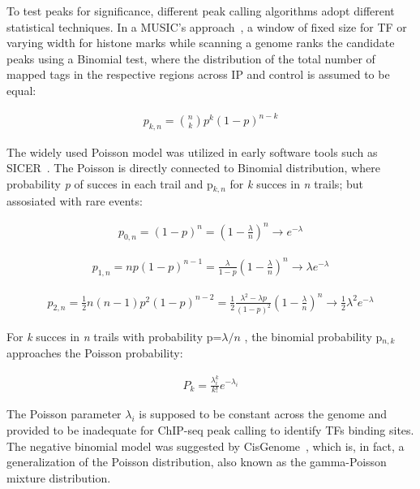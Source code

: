 To test peaks for significance, different peak calling algorithms adopt different statistical techniques. 
In a MUSIC's approach~\cite{harmanci2014music}, a window of fixed size for TF or varying width for histone marks while scanning a genome ranks the candidate peaks using a Binomial test, where the distribution of the total number of mapped tags in the respective regions across IP and control is assumed to be equal:

\begin{align*}
    p_{k,n} = \binom{n}{k}p^k(1-p)^{n-k}
\end{align*}

The widely used Poisson model was utilized in early software tools such as SICER~\cite{zang2009clustering}. 
The Poisson is directly connected to Binomial distribution,
where probability \textit{p} of succes in each trail and p$_{k,n}$  for \textit{k} succes in \textit{n} trails; but assosiated with rare events:

\begin{align*}
    p_{0,n} = (1 - p)^{n} = \left(1-{\frac{\lambda}{n}}\right)^{n} \to e^{-\lambda}
\end{align*}

\begin{align*}
    p_{1,n} = np(1 - p)^{n-1} = \frac{\lambda}{1-p}\left(1-{\frac{\lambda}{n}}\right)^{n} \to \lambda e^{-\lambda}
\end{align*}

\begin{align*}
    p_{2,n} = \frac{1}{2} n(n - 1) p^{2} (1-p)^{n-2} = \frac{1}{2} \frac{\lambda^{2} - \lambda p}{ (1-p)^{2}} \left(1-{\frac{\lambda}{n}}\right)^{n} \to \frac{1}{2} \lambda^{2} e^{-\lambda}
\end{align*}

For \textit{k} succes in \textit{n} trails with probability p=${\lambda / n}$ , the binomial probability p$_{n,k}$ approaches the Poisson probability:

\begin{align*}
    P_k = \frac{\lambda _i ^{k}}{k!} e^{- \lambda _i}
\end{align*}

The Poisson parameter $\lambda_i$ is supposed to be constant across the genome and provided to be inadequate for ChIP-seq peak calling to identify TFs binding sites. 
The negative binomial model was suggested by CisGenome~\cite{ji2008inte}, which is, in fact, a generalization of the Poisson distribution, also known as the gamma-Poisson mixture distribution. 

